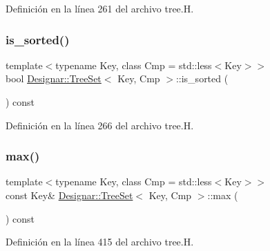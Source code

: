 Definición en la línea 261 del archivo tree.\+H.

\mbox{\label{class_designar_1_1_tree_set_a6321737660e743877ece201a0af184d0}} 
\subsubsection{\texorpdfstring{is\+\_\+sorted()}{is\_sorted()}}
{\footnotesize\ttfamily template$<$typename Key, class Cmp = std\+::less$<$\+Key$>$$>$ \\
bool \hyperlink{class_designar_1_1_tree_set}{Designar\+::\+Tree\+Set}$<$ Key, Cmp $>$\+::is\+\_\+sorted (\begin{DoxyParamCaption}{ }\end{DoxyParamCaption}) const\hspace{0.3cm}{\ttfamily [inline]}}



Definición en la línea 266 del archivo tree.\+H.

\mbox{\label{class_designar_1_1_tree_set_a7456e486d8d35aa2c21387389cab091d}} 
\subsubsection{\texorpdfstring{max()}{max()}}
{\footnotesize\ttfamily template$<$typename Key, class Cmp = std\+::less$<$\+Key$>$$>$ \\
const Key\& \hyperlink{class_designar_1_1_tree_set}{Designar\+::\+Tree\+Set}$<$ Key, Cmp $>$\+::max (\begin{DoxyParamCaption}{ }\end{DoxyParamCaption}) const\hspace{0.3cm}{\ttfamily [inline]}}



Definición en la línea 415 del archivo tree.\+H.

\mbox{\label{class_designar_1_1_tree_set_a12b0c311162ba44de775258ef9897800}} 
